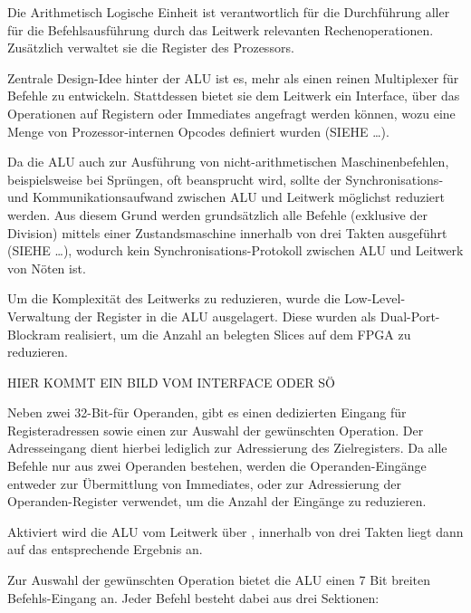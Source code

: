 \label{ch:alu}

Die Arithmetisch Logische Einheit ist verantwortlich f\"ur die Durchf\"uhrung aller f\"ur die Befehlsausf\"uhrung durch das Leitwerk relevanten Rechenoperationen. Zus\"atzlich verwaltet sie die Register des Prozessors.


Zentrale Design-Idee hinter der ALU ist es, mehr als einen reinen Multiplexer f\"ur Befehle zu entwickeln. Stattdessen bietet sie dem Leitwerk ein Interface,
\"uber das Operationen auf Registern oder Immediates angefragt werden k\"onnen, wozu eine Menge von Prozessor-internen Opcodes definiert wurden (SIEHE …).

Da die ALU auch zur Ausf\"uhrung von nicht-arithmetischen Maschinenbefehlen, beispielsweise bei Spr\"ungen, oft beansprucht wird, sollte der Synchronisations- und Kommunikationsaufwand zwischen ALU und Leitwerk m\"oglichst reduziert werden.
Aus diesem Grund werden grunds\"atzlich alle Befehle (exklusive der Division) mittels einer Zustandsmaschine innerhalb von drei Takten ausgef\"uhrt (SIEHE …), wodurch kein Synchronisations-Protokoll zwischen ALU und Leitwerk von N\"oten ist.

Um die Komplexit\"at des Leitwerks zu reduzieren, wurde die Low-Level-Verwaltung der Register in die ALU ausgelagert. Diese wurden als Dual-Port-Blockram realisiert, um die Anzahl an belegten Slices auf dem FPGA zu reduzieren.

HIER KOMMT EIN BILD VOM INTERFACE ODER S\"O

Neben zwei 32-Bit-f\"ur Operanden, gibt es einen dedizierten Eingang f\"ur Registeradressen sowie einen zur Auswahl der gew\"unschten Operation. 
Der Adresseingang dient hierbei lediglich zur Adressierung des Zielregisters. Da alle Befehle nur aus zwei Operanden bestehen, werden die Operanden-Eing\"ange entweder zur \"Ubermittlung von Immediates, oder zur Adressierung der Operanden-Register verwendet, um die Anzahl der Eing\"ange zu reduzieren.

Aktiviert wird die ALU vom Leitwerk \"uber , innerhalb von drei Takten liegt dann auf  das entsprechende Ergebnis an.

Zur Auswahl der gew\"unschten Operation bietet die ALU einen 7 Bit breiten Befehls-Eingang an.
Jeder Befehl besteht dabei aus drei Sektionen\vspace{10pt}:

\vspace{5pt}

